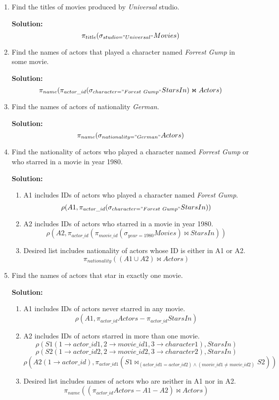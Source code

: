 \begin{enumerate}
\item Find the titles of movies produced by \textit{Universal} studio.

\textbf{Solution:}
$$\displaystyle \pi_{title}(\sigma_{studio="Universal"}Movies) $$

\item Find the names of actors that played a character named \textit{Forrest Gump} in some movie.

\textbf{Solution:}
$$\displaystyle \pi_{name}(\pi_{actor\_id}(\sigma_{character="Forest\ Gump"}StarsIn)\Join Actors)$$

\item Find the names of actors of nationality \textit{German}.

\textbf{Solution:}
$$\displaystyle \pi_{name}(\sigma_{nationality="German"}Actors)$$

\item Find the nationality of actors who played a character named \textit{Forrest Gump} or who starred in a movie in year 1980.

\textbf{Solution:}
\begin{enumerate}
\item A1 includes IDs of actors who played a character named \textit{Forest Gump}.
$$ \rho(A1,\pi_{actor\_id}(\sigma_{character="Forest\ Gump"}StarsIn))$$
\item A2 includes IDs of actors who starred in a movie in year 1980.
$$ \rho(A2,\pi_{actor\_id}(\pi_{movie\_id}(\sigma_{year=1980}Movies)\Join StarsIn))$$
\item Desired list includes nationality of actors whose ID is either in A1 or A2.
$$ \pi_{nationality}((A1\cup A2)\Join Actors)$$
\end{enumerate}

\item Find the names of actors that star in exactly one movie.

\textbf{Solution:}
\begin{enumerate}
\item A1 includes IDs of actors never starred in any movie.
$$ \rho(A1,\pi_{actor\_id}Actors-\pi_{actor\_id}StarsIn) $$
\item A2 includes IDs of actors starred in more than one movie.
$$ \rho(S1(1\rightarrow actor\_id1,2\rightarrow movie\_id1,3\rightarrow character1),StarsIn) $$
$$ \rho(S2(1\rightarrow actor\_id2,2\rightarrow movie\_id2,3\rightarrow character2),StarsIn) $$
$$ \rho(A2(1\rightarrow actor\_id),\pi_{actor\_id1} (S1 \Join_{(actor\_id1=actor\_id2) \wedge (movie\_id1\neq movie\_id2)} S2)) $$
\item Desired list includes names of actors who are neither in A1 nor in A2.
$$ \pi_{name}((\pi_{actor\_id}Actors - A1 - A2) \Join Actors)  $$
\end{enumerate}


\end{enumerate}
